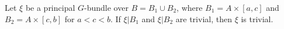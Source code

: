 Let $\xi$ be a principal $G$-bundle over $B = B_1 \cup B_2$, where $B_1 = A \times [a, c]$ and $B_2 = A \times [c, b]$ for $a < c < b$. If $\xi|B_1$ and $\xi|B_2$ are trivial, then $\xi$ is trivial.
